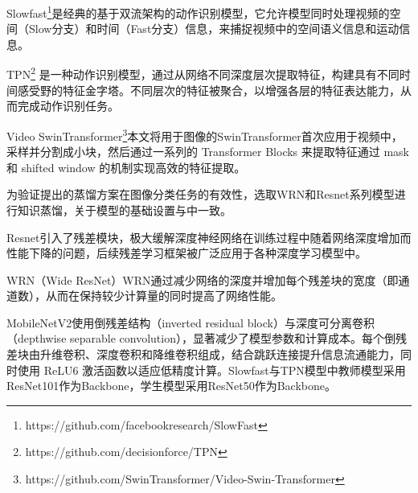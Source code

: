 \documentclass[10.5pt,letterpaper]{article}
\begin{document}
Slowfast\cite{feichtenhofer-iccv2019-slowfast}\footnote{https://github.com/facebookresearch/SlowFast
}是经典的基于双流架构的动作识别模型，它允许模型同时处理视频的空间（Slow分支）和时间（Fast分支）信息，来捕捉视频中的空间语义信息和运动信息。

TPN\cite{yang-cvpr2020-temporal}\footnote{https://github.com/decisionforce/TPN} 是一种动作识别模型，通过从网络不同深度层次提取特征，构建具有不同时间感受野的特征金字塔。不同层次的特征被聚合，以增强各层的特征表达能力，从而完成动作识别任务。

Video SwinTransformer\cite{liu-cvpr2022-video}\footnote{https://github.com/SwinTransformer/Video-Swin-Transformer}本文将用于图像的SwinTransformer首次应用于视频中，采样并分割成小块，然后通过一系列的 Transformer Blocks 来提取特征通过 mask 和 shifted window 的机制实现高效的特征提取。

为验证提出的蒸馏方案在图像分类任务的有效性，选取WRN\cite{zagoruyko-bmvc2017-residual}和Resnet\cite{he-cvpr2016-residual}系列模型进行知识蒸馏，关于模型的基础设置与\cite{pham-wacv2024-frequency}中一致。

Resnet\cite{he-cvpr2016-residual}引入了残差模块，极大缓解深度神经网络在训练过程中随着网络深度增加而性能下降的问题，后续残差学习框架被广泛应用于各种深度学习模型中。

WRN\cite{zagoruyko-bmvc2017-residual}（Wide ResNet）WRN通过减少网络的深度并增加每个残差块的宽度（即通道数），从而在保持较少计算量的同时提高了网络性能。

MobileNetV2\cite{sandler-cvpr2018-mobilenetv2}使用倒残差结构（inverted residual block）与深度可分离卷积（depthwise separable convolution），显著减少了模型参数和计算成本。每个倒残差块由升维卷积、深度卷积和降维卷积组成，结合跳跃连接提升信息流通能力，同时使用 ReLU6 激活函数以适应低精度计算。Slowfast与TPN模型中教师模型采用ResNet101作为Backbone，学生模型采用ResNet50作为Backbone。
\end{document}
